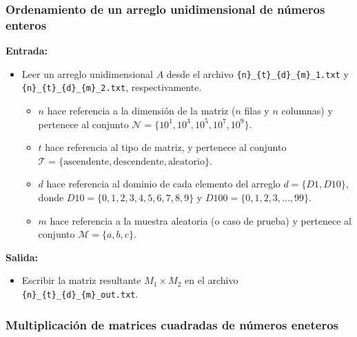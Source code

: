 \subsubsection{Ordenamiento de un arreglo unidimensional de números enteros}

\textbf{Entrada:}
\begin{itemize}
    \item Leer un arreglo unidimensional $A$ desde el archivo \texttt{\{n\}\_\{t\}\_\{d\}\_\{m\}\_1.txt} y \texttt{\{n\}\_\{t\}\_\{d\}\_\{m\}\_2.txt}, respectivamente.
    \begin{itemize}
        \item $n$ hace referencia a la dimensión de la matriz ($n$ filas y $n$ columnas) y pertenece al conjunto $\mathcal{N} = \{10^1, 10^3, 10^5, 10^{7}, 10^{9}\}$.
        \item $t$ hace referencia al tipo de matriz, y pertenece al conjunto $\mathcal{T} = \{ \text{ascendente}, \text{descendente}, \text{aleatorio} \}$.
        \item $d$ hace referencia al dominio de cada elemento del arreglo $d = \{D1, D10\}$, donde $D10 = \{0,1,2,3,4,5,6,7,8,9\}$ y $D100 = \{0,1,2,3,...,99\}$.
        \item $m$ hace referencia a la muestra aleatoria (o caso de prueba) y pertenece al conjunto $\mathcal{M} = \{a,b,c\}$.
    \end{itemize}
\end{itemize}

\textbf{Salida:}
\begin{itemize}
    \item Escribir la matriz resultante $M_1 \times M_2$ en el archivo \texttt{\{n\}\_\{t\}\_\{d\}\_\{m\}\_out.txt}.
\end{itemize}

\subsubsection{Multiplicación de matrices cuadradas de números eneteros}

